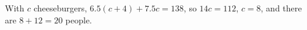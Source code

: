 With $c$ cheeseburgers, $6.5(c+4)+7.5c=138$, so $14c=112$, $c=8$, and there are $8+12=\boxed{20}$ people.
